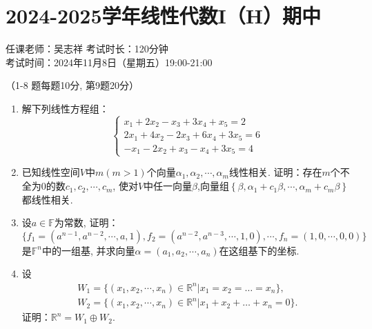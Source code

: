 \section*{2024-2025学年线性代数I（H）期中}

\begin{center}
    任课老师：吴志祥\hspace{4em} 考试时长：120分钟 \\
    考试时间：2024年11月8日（星期五）19:00-21:00
\end{center}

（1-8 题每题10分, 第9题20分）

\begin{enumerate}
    \item 解下列线性方程组：
          \[
              \begin{cases}
                  x_1 + 2x_2 - x_3 + 3x_4 +x_5 = 2     \\
                  2x_1 + 4x_2 - 2x_3 + 6x_4 + 3x_5 = 6 \\
                  -x_1 - 2x_2 + x_3 - x_4 + 3x_5 = 4
              \end{cases}
          \]

    \item 已知线性空间\(V\)中\(m(m > 1)\)个向量\(\alpha_1,\alpha_2,\cdots,\alpha_{m}\)线性相关. 证明：存在\(m\)个不全为\(0\)的数\(c_1,c_2,\cdots,c_{m}\), 使对\(V\)中任一向量\(\beta\),向量组\(\left\{ \beta,\alpha_1 + c_1\beta,\cdots,\alpha_{m} + c_{m}\beta \right\}\)都线性相关.

    \item 设\(a \in \mathbb{F}\)为常数, 证明：
          \[\{ f_1 = \left( a^{n - 1},a^{n - 2},\cdots,a,1 \right),f_2 = \left( a^{n - 2},a^{n - 3},\cdots,1,0 \right),\cdots,f_{n} = (1,0,\cdots,0,0)\}\]
          是\(\mathbb{F}^{n}\)中的一组基, 并求向量\(\alpha = \left( a_1,a_2,\cdots,a_{n} \right)\)在这组基下的坐标.

    \item 设
          \begin{align*}
              W_1 = \{ \left( x_1,x_2,\cdots,x_{n} \right) \in  \mathbb{R}^{n} | x_1 = x_2 = \ldots = x_{n} \}, \\
              W_2 = \{ \left( x_1,x_2,\cdots,x_{n} \right) \in  \mathbb{R}^{n} | x_1 + x_2 + \ldots + x_{n} = 0 \}.
          \end{align*}
          证明：\(\mathbb{R}^{n} = W_1 \oplus W_2\).


\end{enumerate}
